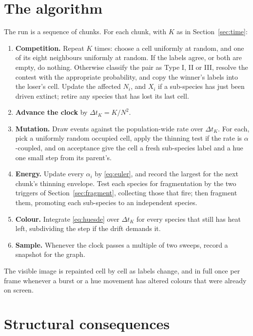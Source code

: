 \documentclass[11pt,a4paper]{article}
\newcommand{\dt}{\Delta t}
\begin{document}
\section{The algorithm}
\label{sec:algorithm}

The run is a sequence of chunks. For each chunk, with $K$ as in Section~\ref{sec:time}:

\begin{enumerate}[itemsep=4pt]
  \item \textbf{Competition.} Repeat $K$ times: choose a cell uniformly at random, and
        one of its eight neighbours uniformly at random. If the labels agree, or both are
        empty, do nothing. Otherwise classify the pair as Type I, II or III, resolve the
        contest with the appropriate probability, and copy the winner's labels into the
        loser's cell. Update the affected $N_i$, and $X_i$ if a sub-species has just been
        driven extinct; retire any species that has lost its last cell.
  \item \textbf{Advance the clock} by $\dt_K = K/N^2$.
  \item \textbf{Mutation.} Draw events against the population-wide rate over $\dt_K$. For
        each, pick a uniformly random occupied cell, apply the thinning test if the rate
        is $\alpha$-coupled, and on acceptance give the cell a fresh sub-species label and
        a hue one small step from its parent's.
  \item \textbf{Energy.} Update every $\alpha_i$ by \eqref{eq:euler}, and record the
        largest for the next chunk's thinning envelope. Test each species for
        fragmentation by the two triggers of Section~\ref{sec:fragment}, collecting those
        that fire; then fragment them, promoting each sub-species to an independent
        species.
  \item \textbf{Colour.} Integrate \eqref{eq:huesde} over $\dt_K$ for every species that
        still has heat left, subdividing the step if the drift demands it.
  \item \textbf{Sample.} Whenever the clock passes a multiple of two sweeps, record a
        snapshot for the graph.
\end{enumerate}

\noindent
The visible image is repainted cell by cell as labels change, and in full once per frame
whenever a burst or a hue movement has altered colours that were already on screen.

\section{Structural consequences}
\label{sec:consequences}
\end{document}
